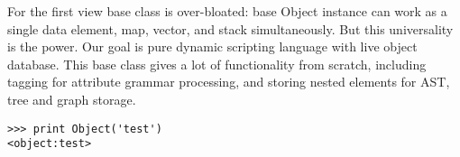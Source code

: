 \noindent
For the first view base class is over-bloated: base Object instance can work as
a single data element, map, vector, and stack simultaneously. But this
universality is the power. Our goal is pure dynamic scripting language with live
object database. This base class gives a lot of functionality from scratch,
including tagging for attribute grammar processing, and storing nested elements
for AST, tree and graph storage.

\begin{lstlisting}
>>> print Object('test')
<object:test>
\end{lstlisting}

\secup